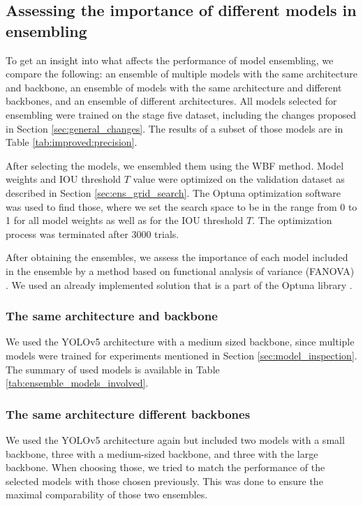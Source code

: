 \subsection{Assessing the importance of different models in ensembling}
\label{sec:methods:assesing_importance}
To get an insight into what affects the performance of model ensembling, we compare the following: an ensemble of multiple models with the same architecture and backbone, an ensemble of models with the same architecture and different backbones, and an ensemble of different architectures. All models selected for ensembling were trained on the stage five dataset, including the changes proposed in Section \ref{sec:general_changes}. The results of a subset of those models are in Table \ref{tab:improved:precision}.


After selecting the models, we ensembled them using the WBF method. Model weights and IOU threshold $T$ value were optimized on the validation dataset as described in Section \ref{sec:ens_grid_search}. The Optuna optimization software was used to find those, where we set the search space to be in the range from 0 to 1 for all model weights as well as for the IOU threshold $T$. The optimization process was terminated after $3000$ trials.

After obtaining the ensembles, we assess the importance of each model included in the ensemble by a method based on functional analysis of variance (FANOVA) \cite{Hutter2014}. We used an already implemented solution that is a part of the Optuna library \cite{Akiba2019}.
\subsubsection{The same architecture and backbone}
We used the YOLOv5 architecture with a medium sized backbone, since multiple models were trained for experiments mentioned in Section \ref{sec:model_inspection}. The summary of used models is available in Table \ref{tab:ensemble_models_involved}.

\subsubsection{The same architecture different backbones}
We used the YOLOv5 architecture again but included two models with a small backbone, three with a medium-sized backbone, and three with the large backbone. When choosing those, we tried to match the performance of the selected models with those chosen previously. This was done to ensure the maximal comparability of those two ensembles.

